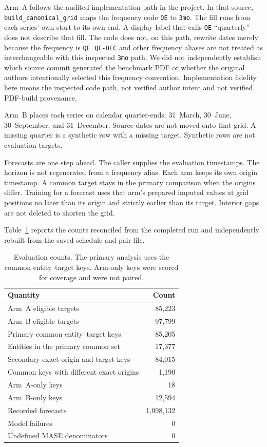 \documentclass[11pt]{article}
\newcommand{\armA}{Arm~A}
\newcommand{\armB}{Arm~B}
\begin{document}
\armA{} follows the audited implementation path in the project.
In that source, \texttt{build\_\hspace{0pt}canonical\_\hspace{0pt}grid} maps the frequency code \texttt{QE} to \texttt{3mo}.
The fill runs from each series' own start to its own end. A display label that calls \texttt{QE} ``quarterly'' does not describe that fill. The code does not, on this path, rewrite dates merely because the frequency is \texttt{QE}. \texttt{QE-DEC} and other frequency aliases are not treated as interchangeable with this inspected \texttt{3mo} path. We did not independently establish which source commit generated the benchmark PDF or whether the original authors intentionally selected this frequency convention. Implementation fidelity here means the inspected code path, not verified author intent and not verified PDF-build provenance.

\armB{} places each series on calendar quarter-ends: 31~March, 30~June, 30~September, and 31~December. Source dates are not moved onto that grid. A missing quarter is a synthetic row with a missing target. Synthetic rows are not evaluation targets.

Forecasts are one step ahead. The caller supplies the evaluation timestamps. The horizon is not regenerated from a frequency alias. Each arm keeps its own origin timestamp. A common target stays in the primary comparison when the origins differ. Training for a forecast uses that arm's prepared imputed values at grid positions no later than its origin and strictly earlier than its target. Interior gaps are not deleted to shorten the grid.

Table~\ref{tab:counts} reports the counts reconciled from the completed run and independently rebuilt from the saved schedule and pair file.

\begin{table}[ht]
\centering
\caption{Evaluation counts. The primary analysis uses the common entity--target keys. Arm-only keys were scored for coverage and were not paired.}
\label{tab:counts}
\begin{tabular}{lr}
\toprule
Quantity & Count \\
\midrule
\armA{} eligible targets & 85{,}223 \\
\armB{} eligible targets & 97{,}799 \\
Primary common entity--target keys & 85{,}205 \\
Entities in the primary common set & 17{,}377 \\
Secondary exact-origin-and-target keys & 84{,}015 \\
Common keys with different exact origins & 1{,}190 \\
\armA{}-only keys & 18 \\
\armB{}-only keys & 12{,}594 \\
Recorded forecasts & 1{,}098{,}132 \\
Model failures & 0 \\
Undefined MASE denominators & 0 \\
\bottomrule
\end{tabular}
\end{table}
\end{document}

